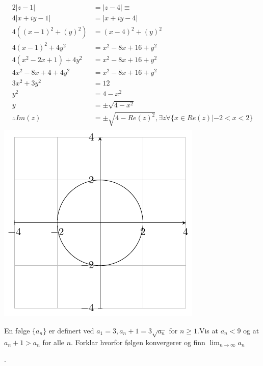 \documentclass{myassignment}
\begin{document}
	\begin{answer}
		\begin{multicols}{2}
			\begin{align*}
				2|z-1| &= |z-4| \equiv \\[2em]
				4|x+iy-1| &= |x+iy-4|\\[1em]
				4((x-1)^2+(y)^2) &= (x-4)^2+(y)^2 \\[1em]
				4(x-1)^2+4y^2 &= x^2-8x+16+y^2 \\[1em]
				4(x^2-2x+1)+4y^2 &= x^2-8x+16+y^2 \\[1em]
				4x^2-8x+4 + 4y^2 &= x^2-8x+16+y^2 \\[1em]
				3x^2 + 3y^2 &= 12 \\[1em]
				y^2 &= 4 - x^2 \\[1em]
				y &= \pm \sqrt{4 - x^2}\\[1em]
				\therefore Im(z) &= \pm\sqrt{4 - Re(z)^2}, \exists z \forall \{x \in Re(z) | -2 < x <2 \} \\[1em]
			\end{align*}
		\columnbreak
		\includegraphics{graphact4}

		\end{multicols}
	\end{answer}


	\begin{problem}
		En følge $\{ a_n \}$ er definert ved $a_1 = 3, a_n + 1 = 3\sqrt{a_n}$ for $n \geq 1$.Vis at $a_n < 9$ og at $a_n+1 > a_n$ for alle $n$. Forklar hvorfor følgen konvergerer og finn $\lim_{n \rightarrow \infty}{a_n}$
	\end{problem}

	\begin{answer}

	\end{answer}.
\end{document}
